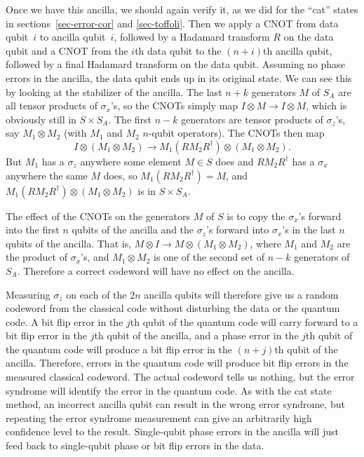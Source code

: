 \documentclass{report}
\newcommand{\X}{\sigma_x}
\newcommand{\Z}{\sigma_z}
\begin{document}
Once we have this ancilla, we should again verify it, as we did for the ``cat'' 
states in sections~\ref{sec-error-cor} and \ref{sec-toffoli}.  Then we apply 
a CNOT from data qubit~$i$ to ancilla qubit~$i$, followed by a Hadamard 
transform $R$ on the data qubit and a CNOT from the $i$th data qubit to 
the $(n+i)$th ancilla qubit, followed by a final Hadamard transform on the 
data qubit.  Assuming no phase errors in the ancilla, the data qubit ends 
up in its original state.  We can see this by looking at the stabilizer of the 
ancilla.  The last $n+k$ generators $M$ of $S_A$ are all tensor products of 
$\X$'s, so the CNOTs simply map $I \otimes M \rightarrow I \otimes M$, 
which is obviously still in $S \times S_A$.  The first $n-k$ generators are 
tensor products of $\Z$'s, say $M_1 \otimes M_2$ (with $M_1$ and $M_2$ 
$n$-qubit operators).  The CNOTs then map
\begin{equation}
I \otimes (M_1 \otimes M_2) \rightarrow M_1 (R M_2 R^\dagger) \otimes 
(M_1 \otimes M_2).
\end{equation}
But $M_1$ has a $\Z$ anywhere some element $M \in S$ does and $R M_2 
R^\dagger$ has a $\X$ anywhere the same $M$ does, so $M_1 (R M_2 
R^\dagger) = M$, and $M_1 (R M_2 R^\dagger) \otimes (M_1 \otimes 
M_2)$ is in $S \times S_A$.

The effect of the CNOTs on the generators $M$ of $S$ is to copy the $\X$'s 
forward into the first $n$ qubits of the ancilla and the $\Z$'s forward into 
$\X$'s in the last $n$ qubits of the ancilla.  That is, $M \otimes I 
\rightarrow M \otimes (M_1 \otimes M_2)$, where $M_1$ and $M_2$ are 
the product of $\X$'s, and $M_1 \otimes M_2$ is one of the second set of 
$n-k$ generators of $S_A$.  Therefore a correct codeword will have no 
effect on the ancilla.

Measuring $\Z$ on each of the $2n$ ancilla qubits will therefore give us a 
random codeword from the classical code without disturbing the data or 
the quantum code.  A bit flip error in the $j$th qubit of the quantum code 
will carry forward to a bit flip error in the $j$th qubit of the ancilla, and a 
phase error in the $j$th qubit of the quantum code will produce a bit flip 
error in the $(n+j)$th qubit of the ancilla.  Therefore, errors in the quantum 
code will produce bit flip errors in the measured classical codeword.  The 
actual codeword tells us nothing, but the error syndrome will identify the 
error in the quantum code.  As with the cat state method, an incorrect 
ancilla qubit can result in the wrong error syndrome, but repeating the 
error syndrome measurement can give an arbitrarily high confidence level 
to the result.  Single-qubit phase errors in the ancilla will just feed back to 
single-qubit phase or bit flip errors in the data.
\end{document}
